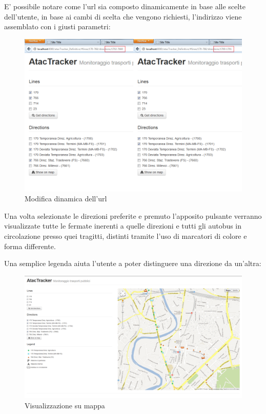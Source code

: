 E' possibile notare come l'url sia composto dinamicamente in base alle scelte dell'utente, in base ai cambi di scelta che vengono richiesti, l'indirizzo viene assemblato con i giusti parametri:

\begin{figure}[htbp]
\begin{center}
\includegraphics[width=12cm]{contents/images/indirizzo}
\end{center}
\caption{Modifica dinamica dell'url}
\label{fig:fermata}
\end{figure}
\newpage
Una volta selezionate le direzioni preferite e premuto l'apposito pulsante verranno visualizzate tutte le fermate inerenti a quelle direzioni e tutti gli autobus in circolazione presso quei tragitti, distinti tramite l'uso di marcatori di colore e forma differente.

Una semplice legenda aiuta l'utente a poter distinguere una direzione da un'altra:

\begin{figure}[htbp]
\begin{center}
\includegraphics[width=13cm]{contents/images/bus}
\end{center}
\caption{Visualizzazione su mappa}
\label{fig:fermata}
\end{figure}

